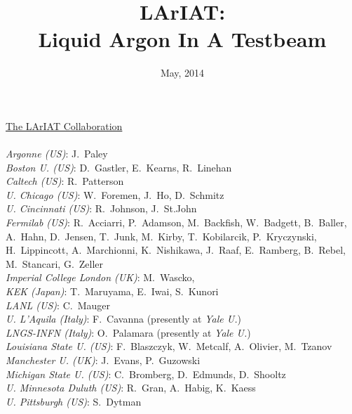 \documentclass[DIV=calc, paper=a4, fontsize=10pt, twocolumn]{scrartcl}	 %
\title{LArIAT: \\  Liquid Argon In A Testbeam} %
\author{\authorthing}
\date{May, 2014} %
\begin{document}
\maketitle %

\thispagestyle{fancy} %

{\Large \color{CadetBlue}
  \vspace{0.3in}
   {\sf \underline{The LArIAT Collaboration}}
  \vspace{0.1in}
}
{\sf\color{DarkRed}
  {}\\
  {}\\
  {\color{CadetBlue}\it Argonne (US)}: J.~Paley\\
  {\color{CadetBlue}\it Boston U. (US)}: D.~Gastler, E.~Kearns, R.~Linehan\\
  {\color{CadetBlue}\it Caltech (US)}: R.~Patterson\\
  {\color{CadetBlue}\it U. Chicago (US)}: W.~Foremen, J.~Ho, D.~Schmitz\\
  {\color{CadetBlue}\it U. Cincinnati (US)}: R.~Johnson, J.~St.John \\
  {\color{CadetBlue}\it Fermilab (US)}:  R.~Acciarri, P.~Adamson, M.~Backfish, W.~Badgett, B.~Baller, A.~Hahn, D.~Jensen, T.~Junk, M.~Kirby, T.~Kobilarcik, 
  P.~Kryczynski, H.~Lippincott, A.~Marchionni, K.~Nishikawa, J.~Raaf, E.~Ramberg, B.~Rebel, M.~Stancari, G.~Zeller \\
  {\color{CadetBlue}\it Imperial College London (UK)}: M.~Wascko, \\
  {\color{CadetBlue}\it KEK (Japan)}: T.~Maruyama, E.~Iwai, S.~Kunori \\
  {\color{CadetBlue}\it LANL (US)}: C.~Mauger\\
  {\color{CadetBlue}\it U. L'Aquila (Italy)}: F.~Cavanna (presently at {\it Yale U.})\\
  {\color{CadetBlue}\it LNGS-INFN (Italy)}: O.~Palamara (presently at {\it Yale U.})\\
  {\color{CadetBlue}\it Louisiana State U. (US)}: F.~Blaszczyk, W.~Metcalf, A.~Olivier, M.~Tzanov\\  
  {\color{CadetBlue}\it Manchester U. (UK)}: J.~Evans, P.~Guzowski\\
  {\color{CadetBlue}\it Michigan State U. (US)}: C.~Bromberg, D.~Edmunds, D.~Shooltz\\
  {\color{CadetBlue}\it U. Minnesota Duluth (US)}: R.~Gran, A.~Habig, K.~Kaess\\
  {\color{CadetBlue}\it U. Pittsburgh  (US)}: S.~Dytman\\
}
\end{document}
